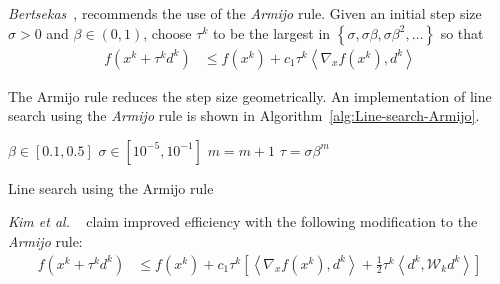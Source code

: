 \documentclass[a4paper,twoside,10pt,english]{report}
\begin{document}
\emph{Bertsekas}~\cite[p. 29]{Bertsekas_NonlinearProgramming}, recommends
the use of the \emph{Armijo} rule. Given an initial step size $\sigma>0$ and 
$\beta\in\left(0,1\right)$, choose $\tau^{k}$ to be the largest in
$\left\{\sigma,\sigma\beta,\sigma\beta^{2},\hdots\right\}$ so that
\begin{align}
f\left(x^{k}+\tau^{k}d^{k}\right) &\le 
f\left(x^{k}\right)+
c_{1}\tau^{k}\left\langle\nabla_{x}f\left(x^{k}\right),d^{k}\right\rangle
\tag{W1}
\end{align}

The Armijo rule reduces the step size geometrically. An implementation of
line search using the \emph{Armijo} rule is shown in 
Algorithm~\ref{alg:Line-search-Armijo}. 

\begin{algorithm}[!htb]
\begin{algorithmic}
\State $\beta\in\left[0.1,0.5\right]$
\State $\sigma\in\left[10^{-5},10^{-1}\right]$
  \State $m=m+1$
\EndWhile
\State $\tau = \sigma \beta ^{m}$
\end{algorithmic}
\caption{Line search using the Armijo rule}
\label{alg:Line-search-Armijo}
\end{algorithm}

\emph{Kim et al.} 
~\cite{KimKwonOh_PerformanceModifiedArmijoLineSearchInBFGSOptimisation}
claim improved efficiency with the following modification to the 
\emph{Armijo} rule:
\begin{align}
f\left(x^{k}+\tau^{k}d^{k}\right) &\le 
f\left(x^{k}\right)+c_{1}\tau^{k}\left[
\left\langle\nabla_{x}f\left(x^{k}\right),d^{k}\right\rangle +
\frac{1}{2}\tau^{k} \left\langle d^{k},\mathcal{W}_{k}d^{k}\right\rangle \right]
\end{align}
\end{document}
